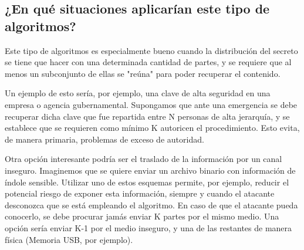 \documentclass[11pt]{scrartcl} %
\begin{document}
\subsection{¿En qué situaciones aplicarían este tipo de algoritmos?}

Este tipo de algoritmos es especialmente bueno cuando la distribución del secreto se tiene que hacer con una determinada cantidad de partes, y se requiere que al menos un subconjunto de ellas se "reúna" para poder recuperar el contenido.

Un ejemplo de esto sería, por ejemplo, una clave de alta seguridad en una empresa o agencia gubernamental. Supongamos que ante una emergencia se debe recuperar dicha clave que fue repartida entre N personas de alta jerarquía, y se establece que se requieren como mínimo K autoricen el procedimiento. Esto evita, de manera primaria, problemas de exceso de autoridad.

Otra opción interesante podría ser el traslado de la información por un canal inseguro. Imaginemos que se quiere enviar un archivo binario con información de índole sensible. Utilizar uno de estos esquemas permite, por ejemplo, reducir el potencial riesgo de exponer esta información, siempre y cuando el atacante desconozca que se está empleando el algoritmo. En caso de que el atacante pueda conocerlo, se debe procurar jamás enviar K partes por el mismo medio. Una opción sería enviar K-1 por el medio inseguro, y una de las restantes de manera física (Memoria USB, por ejemplo).

\end{document}
